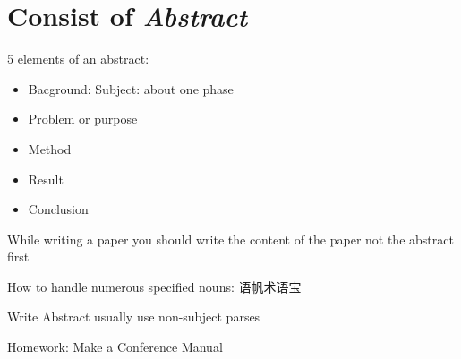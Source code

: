 \section{Consist of \textit{Abstract}}%
\label{sec:Consist of Abstract}
5 elements of an abstract:
\begin{itemize}
    \item Bacground: Subject: about one phase
    \item Problem or purpose
    \item Method
    \item Result
    \item Conclusion
\end{itemize}
\begin{notation}
    While writing a paper you should write the content of the paper not the abstract first
\end{notation}
\begin{notation}
    How to handle numerous specified nouns: 语帆术语宝

    Write Abstract usually use non-subject parses
\end{notation}
Homework: Make a Conference Manual

